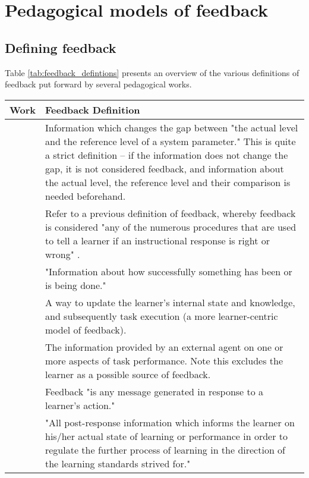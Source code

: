 \section{Pedagogical models of feedback}
\label{app:feedback_definitions}

\subsection{Defining feedback}

Table \ref{tab:feedback_defintions} presents an overview of the various definitions of feedback put forward by several pedagogical works.


\begin{table*}[h]
  \centering
  \begin{tabularx}{\textwidth}{p{3.95cm}|X}
    \toprule
    Work  & Feedback Definition  \\
    \midrule
    \citet{ramaprasad_definition_1983} & Information which changes the gap between "the actual level and the reference level of a system parameter." This is quite a strict definition -- if the information does not change the gap, it is not considered feedback, and information about the actual level, the reference level and their comparison is needed beforehand. \\
    \midrule
    \citet{kulhavy_feedback_1989} & Refer to a previous definition of feedback, whereby feedback is considered "any of the numerous procedures that are used to tell a learner if an instructional response is right or wrong" \citep{kulhavy_feedback_1977}.
    \\
    \midrule
    \citet{sadler_formative_1989} & "Information about how successfully something has been or is being done." \\
    \midrule
    \citet{butler_feedback_1995} & A way to update the learner's internal state and knowledge, and subsequently task execution (a more learner-centric model of feedback). \\
    \midrule
    \citet{kluger_effects_1996} & The information provided by an external agent on one or more aspects of task performance. Note this excludes the learner as a possible source of feedback.  \\
    \midrule
    \citet{mason_providing_2001} & Feedback "is any message generated in response to a learner's action." \\
    \midrule
    \citet{narciss_how_2004, narciss_feedback_2008} & "All post-response information which informs the learner on his/her actual state of learning or performance in order to regulate the further process of learning in the direction of the learning standards strived for." \\

\end{tabularx}
\end{table*}
